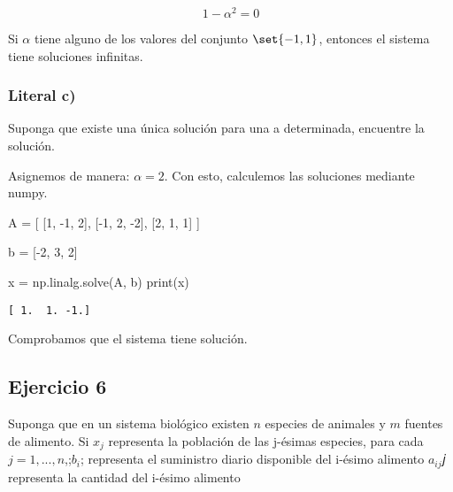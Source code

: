 \documentclass[
  letterpaper,
  DIV=11,
  numbers=noendperiod]{scrartcl}
\newenvironment{Shaded}{\begin{snugshade}}{\end{snugshade}}
\newcommand{\BuiltInTok}[1]{\textcolor[rgb]{0.00,0.23,0.31}{#1}}
\newcommand{\DecValTok}[1]{\textcolor[rgb]{0.68,0.00,0.00}{#1}}
\newcommand{\NormalTok}[1]{\textcolor[rgb]{0.00,0.23,0.31}{#1}}
\newcommand{\OperatorTok}[1]{\textcolor[rgb]{0.37,0.37,0.37}{#1}}
\begin{document}
\[1 - \alpha^{2} = 0\]

Si \(\alpha\) tiene alguno de los valores del conjunto \(\set{-1, 1}\),
entonces el sistema tiene soluciones infinitas.

\subsubsection{Literal c)}\label{literal-c-3}

Suponga que existe una única solución para una a determinada, encuentre
la solución.

Asignemos de manera: \(\alpha = 2\). Con esto, calculemos las soluciones
mediante numpy.

\begin{Shaded}
\begin{Highlighting}[]

\NormalTok{A }\OperatorTok{=}\NormalTok{ [}
\NormalTok{    [}\DecValTok{1}\NormalTok{, }\OperatorTok{{-}}\DecValTok{1}\NormalTok{, }\DecValTok{2}\NormalTok{],}
\NormalTok{    [}\OperatorTok{{-}}\DecValTok{1}\NormalTok{, }\DecValTok{2}\NormalTok{, }\OperatorTok{{-}}\DecValTok{2}\NormalTok{],}
\NormalTok{    [}\DecValTok{2}\NormalTok{, }\DecValTok{1}\NormalTok{, }\DecValTok{1}\NormalTok{]}
\NormalTok{]}

\NormalTok{b }\OperatorTok{=}\NormalTok{ [}\OperatorTok{{-}}\DecValTok{2}\NormalTok{, }\DecValTok{3}\NormalTok{, }\DecValTok{2}\NormalTok{]}

\NormalTok{x }\OperatorTok{=}\NormalTok{ np.linalg.solve(A, b)}
\BuiltInTok{print}\NormalTok{(x)}
\end{Highlighting}
\end{Shaded}

\begin{verbatim}
[ 1.  1. -1.]
\end{verbatim}

Comprobamos que el sistema tiene solución.

\subsection{Ejercicio 6}\label{ejercicio-6}

Suponga que en un sistema biológico existen \(n\) especies de animales y
\(m\) fuentes de alimento. Si \(x_j\) representa la población de las
j-ésimas especies, para cada \(j = 1, ... , n\),;\(b_i\); representa el
suministro diario disponible del i-ésimo alimento \(a_{ij}\)𝑗 representa
la cantidad del i-ésimo alimento
\end{document}

